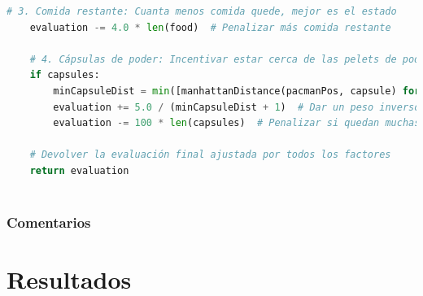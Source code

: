 \documentclass{report}
\begin{document}
\begin{lstlisting}[language=Python, caption=Implementación final de la función de evaluación]
    # 3. Comida restante: Cuanta menos comida quede, mejor es el estado
    evaluation -= 4.0 * len(food)  # Penalizar más comida restante

    # 4. Cápsulas de poder: Incentivar estar cerca de las pelets de poder
    if capsules:
        minCapsuleDist = min([manhattanDistance(pacmanPos, capsule) for capsule in capsules])
        evaluation += 5.0 / (minCapsuleDist + 1)  # Dar un peso inverso a la distancia a las pelets
        evaluation -= 100 * len(capsules)  # Penalizar si quedan muchas pelets sin recoger

    # Devolver la evaluación final ajustada por todos los factores
    return evaluation
        
          \end{lstlisting}
        \subsection*{Comentarios}
    \chapter{Resultados}
\end{document}
